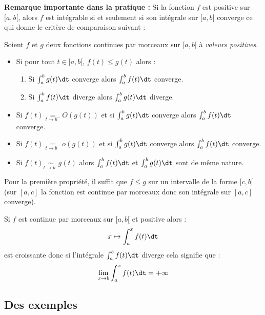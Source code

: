 \documentclass[a4paper,10pt]{report}
\begin{document}
\medskip

\noindent \textbf{Remarque importante dans la pratique :} Si la fonction $f$ est positive sur $[a,b[$, alors $f$ est intégrable si et seulement si son intégrale sur $[a,b[$ converge ce qui donne le critère de comparaison suivant :

\medskip

\begin{thm} Soient $f$ et $g$ deux fonctions continues par morceaux sur $[a,b[$ à \textit{valeurs positives}.

\begin{itemize}
\item Si pour tout $t \in [a,b[$, $f(t) \leq g(t)$ alors :

\begin{enumerate}
\item Si $ \int_{a}^{b} g(t) \dt$ converge alors $ \int_{a}^{b} f(t) \dt$ converge.
\item Si $ \int_{a}^{b} f(t) \dt$ diverge alors $ \int_{a}^{b} g(t) \dt$ diverge.
\end{enumerate}
\item Si $f(t) \underset{ t \rightarrow b^{-}}{=} O(g(t))$ et si $ \int_{a}^{b} g(t) \dt$ converge alors $ \int_{a}^{b} f(t) \dt$ converge.
\item Si $f(t) \underset{ t \rightarrow b^{-}}{=} o(g(t))  $ et si $ \int_{a}^{b} g(t) \dt$ converge alors $ \int_{a}^{b} f(t) \dt$ converge.
\item Si $f(t) \underset{ t \rightarrow b^{-}}{\sim}g(t)$ alors $\int_{a}^{b} f(t) \dt$ et $\int_{a}^{b} g(t) \dt$ sont de même nature.
\end{itemize}
\end{thm}

\begin{rems}
\item Pour la première propriété, il suffit que $f \leq g$ sur un intervalle de la forme $[c,b[$ (sur $[a,c]$ la fonction est continue par morceaux donc son intégrale sur $[a,c]$ converge).
\item Si $f$ est continue par morceaux sur $[a,b[$ et positive alors :
$$ x \mapsto \int_{a}^x f(t) \dt$$
est croissante donc si l'intégrale $\int_{a}^{b} f(t) \dt$ diverge cela signifie que :
$$ \lim_{x \rightarrow b} \int_{a}^x f(t) \dt = + \infty$$
\end{rems}

\subsection{Des exemples}
\end{document}
